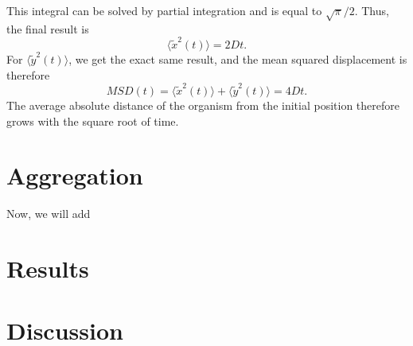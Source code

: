 \documentclass{article}
\begin{document}
This integral can be solved by partial integration and is equal to $\sqrt{\pi}/2$.
Thus, the final result is 
\begin{equation*}
    \langle \tilde{x}^2(t)\rangle = 2Dt.
\end{equation*}
For $\langle \tilde{y}^2(t)\rangle$, we get the exact same result, and the mean squared displacement is therefore
\begin{equation*}
    MSD(t) = \langle \tilde{x}^2(t)\rangle + \langle \tilde{y}^2(t)\rangle  = 4Dt.
\end{equation*}
The average absolute distance of the organism from the initial position therefore grows with the square root of time.

\section{Aggregation}
Now, we will add  
\section{Results}

\section{Discussion}
\printbibliography
\end{document}
